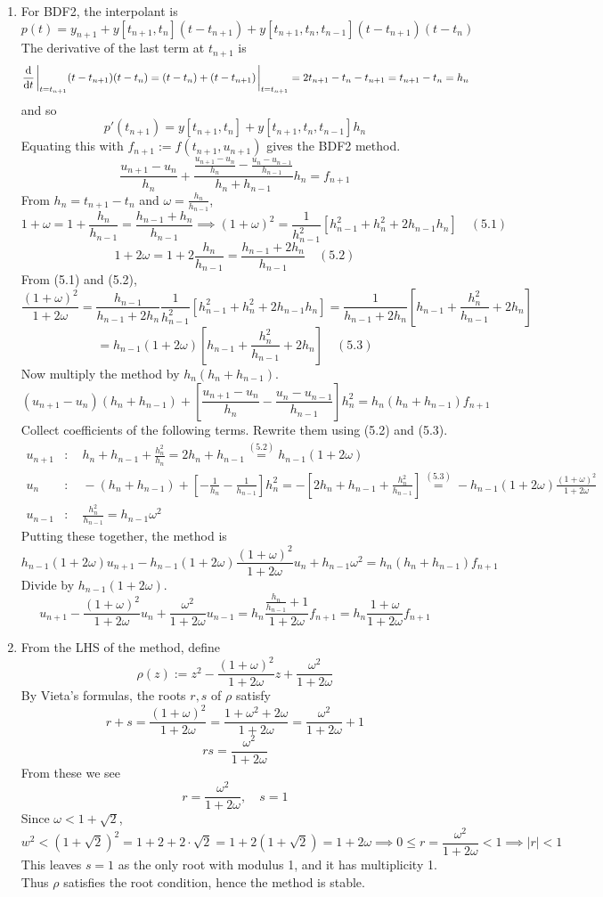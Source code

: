 \documentclass{article}
\newcommand{\sbr}[1]{\left[#1\right]}
\newcommand{\imp}{\implies}
\newcommand{\om}{\omega}
\begin{document}
\begin{enumerate}
\begin{enumerate}[label=(\alph*)]
	\item For BDF2, the interpolant is
	$$p(t) = y_{n+1} + y[t_{n+1},t_n](t-t_{n+1}) + y[t_{n+1},t_n,t_{n-1}](t-t_{n+1})(t-t_n)$$
	The derivative of the last term at $t_{n+1}$ is
	$$\dv{t}\eval_{t=t_{n+1}} (t-t_{n+1})(t-t_n)
	= (t-t_{n})+(t-t_{n+1})\eval_{t=t_{n+1}}
	= 2t_{n+1}-t_{n}-t_{n+1}
	= t_{n+1}-t_n
	= h_n$$
	and so
	$$p'(t_{n+1}) = y[t_{n+1},t_n] + y[t_{n+1},t_n,t_{n-1}]h_n$$
	Equating this with $f_{n+1}:=f(t_{n+1},u_{n+1})$ gives the BDF2 method.
	$$\frac{u_{n+1}-u_n}{h_n} + \frac{\frac{u_{n+1}-u_n}{h_n} - \frac{u_n-u_{n-1}}{h_{n-1}}}{h_n+h_{n-1}}h_n = f_{n+1}$$
	From $h_n=t_{n+1}-t_n$ and $\om=\frac{h_n}{h_{n-1}}$,
	$$1 + \om = 1 + \frac{h_n}{h_{n-1}} = \frac{h_{n-1}+h_n}{h_{n-1}}
	\imp (1+\om)^2 = \frac{1}{h_{n-1}^2}\sbr{h_{n-1}^2+h_n^2+2h_{n-1}h_n} \quad (5.1)$$
	$$1 + 2\om = 1 + 2\frac{h_n}{h_{n-1}} = \frac{h_{n-1}+2h_n}{h_{n-1}} \quad (5.2)$$
	From (5.1) and (5.2),
	$$\frac{(1+\om)^2}{1+2\om} = \frac{h_{n-1}}{h_{n-1}+2h_n}\frac{1}{h_{n-1}^2}\sbr{h_{n-1}^2+h_n^2+2h_{n-1}h_n}
	= \frac{1}{h_{n-1}+2h_n}\sbr{h_{n-1}+\frac{h_n^2}{h_{n-1}}+2h_n}$$
	$$= h_{n-1}(1+2\om)\sbr{h_{n-1}+\frac{h_n^2}{h_{n-1}}+2h_n} \quad (5.3)$$
	Now multiply the method by $h_n(h_n+h_{n-1})$.
	$$(u_{n+1}-u_n)(h_n+h_{n-1}) + \sbr{\frac{u_{n+1}-u_n}{h_n} - \frac{u_n-u_{n-1}}{h_{n-1}}}h_n^2 = h_n(h_n+h_{n-1})f_{n+1}$$
	Collect coefficients of the following terms. Rewrite them using (5.2) and (5.3).
	\begin{align*}
		u_{n+1} &: \quad h_n + h_{n-1} + \frac{h_n^2}{h_n} = 2h_n + h_{n-1} \overset{(5.2)}{=} h_{n-1}(1+2\om) \\
		u_n &: \quad -(h_n + h_{n-1}) + \sbr{-\frac{1}{h_n} - \frac{1}{h_{n-1}}}h_n^2 = -\sbr{2h_n + h_{n-1} + \frac{h_n^2}{h_{n-1}}} \overset{(5.3)}{=} -h_{n-1}(1+2\om)\frac{(1+\om)^2}{1+2\om} \\
		u_{n-1} &: \quad \frac{h_n^2}{h_{n-1}} = h_{n-1}\om^2
	\end{align*}
	Putting these together, the method is
	$$h_{n-1}(1+2\om)u_{n+1} - h_{n-1}(1+2\om)\frac{(1+\om)^2}{1+2\om}u_n + h_{n-1}\om^2 = h_n(h_n+h_{n-1})f_{n+1}$$
	Divide by $h_{n-1}(1+2\om)$.
	$$u_{n+1} - \frac{(1+\om)^2}{1+2\om}u_n + \frac{\om^2}{1+2\om}u_{n-1} = h_n\frac{\frac{h_n}{h_{n-1}}+1}{1+2\om}f_{n+1}
	= h_n\frac{1+\om}{1+2\om}f_{n+1}$$
	
	
	\item From the LHS of the method, define
	$$\rho(z) := z^2 - \frac{(1+\om)^2}{1+2\om}z + \frac{\om^2}{1+2\om}$$
	By Vieta's formulas, the roots $r,s$ of $\rho$ satisfy
	$$r + s = \frac{(1+\om)^2}{1+2\om} = \frac{1+\om^2+2\om}{1+2\om} = \frac{\om^2}{1+2\om} + 1$$
	$$rs = \frac{\om^2}{1+2\om}$$
	From these we see
	$$r = \frac{\om^2}{1+2\om},
	\quad s = 1$$
	Since $\om<1+\sqrt2$,
	$$w^2 < (1+\sqrt2)^2 = 1 + 2 + 2\cdot\sqrt2 = 1 + 2(1+\sqrt2) = 1 + 2\om
	\imp 0 \le r = \frac{\om^2}{1+2\om} < 1
	\imp |r|<1$$
	This leaves $s=1$ as the only root with modulus 1, and it has multiplicity 1. Thus $\rho$ satisfies the root condition, hence the method is stable.
	
\end{enumerate}	
	
\end{enumerate}
\end{document}

